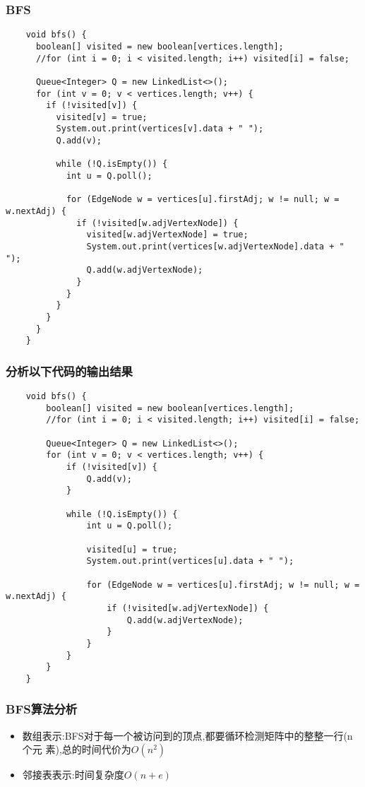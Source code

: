 \begin{frame}
  \frametitle{BFS}

  \begin{verbatim}
    void bfs() {
      boolean[] visited = new boolean[vertices.length];
      //for (int i = 0; i < visited.length; i++) visited[i] = false;

      Queue<Integer> Q = new LinkedList<>();
      for (int v = 0; v < vertices.length; v++) {
        if (!visited[v]) {
          visited[v] = true;
          System.out.print(vertices[v].data + " ");
          Q.add(v);

          while (!Q.isEmpty()) {
            int u = Q.poll();

            for (EdgeNode w = vertices[u].firstAdj; w != null; w = w.nextAdj) {
              if (!visited[w.adjVertexNode]) {
                visited[w.adjVertexNode] = true;
                System.out.print(vertices[w.adjVertexNode].data + " ");
                Q.add(w.adjVertexNode);
              }
            }
          }
        }
      }
    }
  \end{verbatim}  
\end{frame}

\begin{frame}
  \frametitle{分析以下代码的输出结果}
  
 \begin{verbatim}
    void bfs() {
        boolean[] visited = new boolean[vertices.length];
        //for (int i = 0; i < visited.length; i++) visited[i] = false;

        Queue<Integer> Q = new LinkedList<>();
        for (int v = 0; v < vertices.length; v++) {
            if (!visited[v]) {
                Q.add(v);
            }

            while (!Q.isEmpty()) {
                int u = Q.poll();

                visited[u] = true;
                System.out.print(vertices[u].data + " ");

                for (EdgeNode w = vertices[u].firstAdj; w != null; w = w.nextAdj) {
                    if (!visited[w.adjVertexNode]) {
                        Q.add(w.adjVertexNode);
                    }
                }
            }
        }
    }
 \end{verbatim}
\end{frame}

\begin{frame}[fragile]
  \frametitle{BFS算法分析}
  \begin{itemize}
  \item 数组表示:BFS对于每一个被访问到的顶点,都要循环检测矩阵中的整整一行(n个元
    素),总的时间代价为$O(n^2)$
  \item 邻接表表示:时间复杂度$O(n+e)$
  \end{itemize}
\end{frame}

